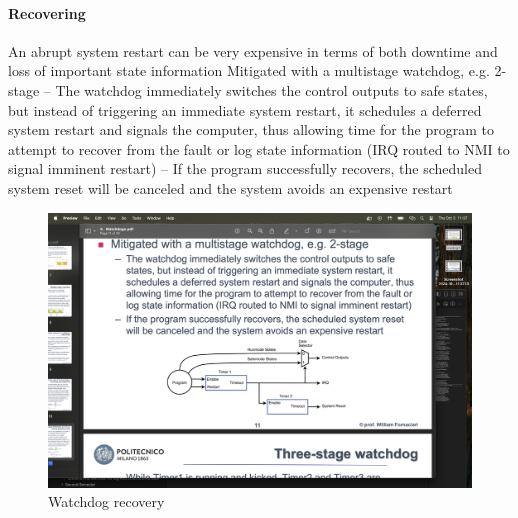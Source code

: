 \paragraph*{Recovering}
An abrupt system restart can be very expensive in terms of
both downtime and loss of important state information
 Mitigated with a multistage watchdog, e.g. 2-stage
– The watchdog immediately switches the control outputs to safe
states, but instead of triggering an immediate system restart, it
schedules a deferred system restart and signals the computer, thus
allowing time for the program to attempt to recover from the fault or
log state information (IRQ routed to NMI to signal imminent restart)
– If the program successfully recovers, the scheduled system reset
will be canceled and the system avoids an expensive restart
\begin{figure}[H]
    \centering
    \includegraphics[width=0.75\linewidth]{images/wdog2.png}
    \caption{Watchdog recovery}
\end{figure}

